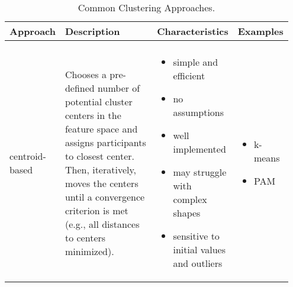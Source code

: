 \begin{sidewaystable}
    \centering
    \caption{Common Clustering Approaches.}
    \label{tab:clusterApproaches} 
    \begin{tabular}{
    >{\raggedright\arraybackslash}p{0.15\linewidth} 
    >{\raggedright\arraybackslash}p{0.40\linewidth} 
    >{\raggedright\arraybackslash}p{0.28\linewidth} 
    >{\raggedright\arraybackslash}p{0.12\linewidth}
    }
        \hline 
        Approach & Description & Characteristics & Examples \\ 
        \hline \\ [-0.5em]
        
        centroid-based \linebreak & 
        Chooses a pre-defined number of potential cluster centers in the feature space and assigns participants to closest center. Then, iteratively, moves the centers until a convergence criterion is met (e.g., all distances to centers minimized).
        \linebreak &
        \vspace{-1em}
        \begin{itemize}[nosep,leftmargin=*,label={--}]
            \item[\scriptsize\faPlusCircle] simple and efficient
            \item[\scriptsize\faPlusCircle] no assumptions
            \item[\scriptsize\faPlusCircle] well implemented
            \item[\scriptsize\faMinusCircle] may struggle with complex shapes
            \item[\scriptsize\faMinusCircle] sensitive to initial values and outliers
        \end{itemize}\linebreak & 
        \vspace{-1em}
        \begin{itemize}[nosep,leftmargin=*,label={--}]
            \item k-means
            \item PAM
        \end{itemize}\linebreak \\ 
        

\end{tabular}
\end{sidewaystable}
